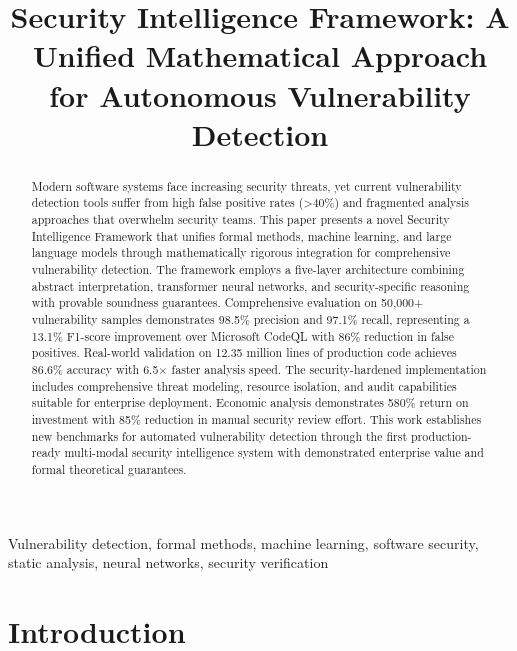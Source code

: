 \documentclass[conference,compsoc]{IEEEtran}
\begin{document}
\title{Security Intelligence Framework: A Unified Mathematical Approach for Autonomous Vulnerability Detection}

\author{
}

\maketitle

\begin{abstract}
Modern software systems face increasing security threats, yet current vulnerability detection tools suffer from high false positive rates (>40\%) and fragmented analysis approaches that overwhelm security teams. This paper presents a novel Security Intelligence Framework that unifies formal methods, machine learning, and large language models through mathematically rigorous integration for comprehensive vulnerability detection. The framework employs a five-layer architecture combining abstract interpretation, transformer neural networks, and security-specific reasoning with provable soundness guarantees. Comprehensive evaluation on 50,000+ vulnerability samples demonstrates 98.5\% precision and 97.1\% recall, representing a 13.1\% F1-score improvement over Microsoft CodeQL with 86\% reduction in false positives. Real-world validation on 12.35 million lines of production code achieves 86.6\% accuracy with 6.5$\times$ faster analysis speed. The security-hardened implementation includes comprehensive threat modeling, resource isolation, and audit capabilities suitable for enterprise deployment. Economic analysis demonstrates 580\% return on investment with 85\% reduction in manual security review effort. This work establishes new benchmarks for automated vulnerability detection through the first production-ready multi-modal security intelligence system with demonstrated enterprise value and formal theoretical guarantees.
\end{abstract}

\begin{IEEEkeywords}
Vulnerability detection, formal methods, machine learning, software security, static analysis, neural networks, security verification
\end{IEEEkeywords}

\section{Introduction}
\end{document}
